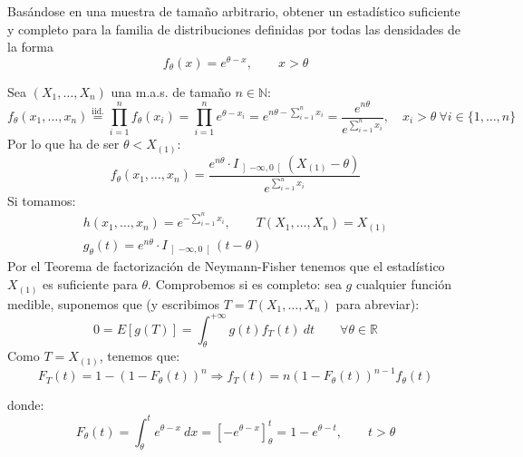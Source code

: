 \begin{ejercicio}
    Basándose en una muestra de tamaño arbitrario, obtener un estadístico suficiente y completo para la familia de distribuciones definidas por todas las densidades de la forma
    \begin{equation*}
        f_\theta(x) = e^{\theta-x}, \qquad x>\theta
    \end{equation*}

    \noindent
    Sea $(X_1, \ldots, X_n)$ una m.a.s. de tamaño $n\in \mathbb{N}$: 
    \begin{equation*}
        f_{\theta}(x_1, \ldots, x_n)  \stackrel{\text{iid.}}{=} \prod_{i=1}^{n}f_\theta(x_i) = \prod_{i=1}^{n}e^{\theta - x_i} = e^{n\theta - \sum\limits_{i=1}^{n}x_i} = \dfrac{e^{n\theta}}{e^{\sum\limits_{i=1}^n x_i}}, \quad x_i > \theta\ \forall i \in \{1,\ldots,n\}
    \end{equation*}
    Por lo que ha de ser $\theta < X_{(1)}$:
    \begin{equation*}
        f_{\theta}(x_1, \ldots, x_n) = \dfrac{e^{n\theta}\cdot I_{\left]-\infty,0\right[}(X_{(1)}-\theta)}{e^{\sum\limits_{i=1}^n x_i}}
    \end{equation*}
    Si tomamos:
    \begin{gather*}
        h(x_1, \ldots, x_n) = e^{-\sum\limits_{i=1}^n x_i}, \qquad T(X_1, \ldots, X_n) = X_{(1)} \\
        g_\theta(t) = e^{n\theta}\cdot I_{\left]-\infty,0\right[}(t-\theta)
    \end{gather*}
    Por el Teorema de factorización de Neymann-Fisher tenemos que el estadístico $X_{(1)}$ es suficiente para $\theta$. Comprobemos si es completo: sea $g$ cualquier función medible, suponemos que (y escribimos $T=T(X_1, \ldots, X_n)$ para abreviar):
    \begin{equation*}
        0 = E[g(T)] = \int_{\theta}^{+\infty} g(t)f_T(t) ~dt  \qquad \forall \theta \in \mathbb{R}
    \end{equation*}
    Como $T=X_{(1)}$, tenemos que:
    \begin{equation*}
        F_T(t) = 1-{(1-F_\theta(t))}^{n} \Longrightarrow f_T(t) = n{(1-F_\theta(t))}^{n-1}f_\theta(t)
    \end{equation*}

    donde:
    \begin{equation*}
        F_\theta(t) = \int_{\theta}^{t} e^{\theta-x} ~dx  = \left[-e^{\theta-x}\right]_{\theta}^t = 1-e^{\theta-t}, \qquad t>\theta
    \end{equation*}


\end{ejercicio}
